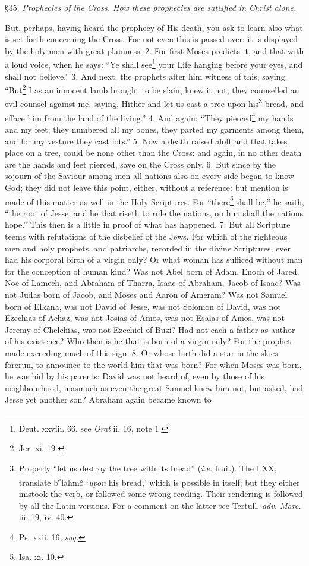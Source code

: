 
§35. \emph{Prophecies of the Cross. How these prophecies are satisfied in Christ alone.}

But, perhaps, having heard the prophecy of His death, you ask to learn also what is set forth concerning the Cross. For not even this is passed over: it is displayed by the holy men with great plainness. 2. For first Moses predicts it, and that with a loud voice, when he says: “Ye shall see\footnote{Deut. xxviii. 66, see \emph{Orat} ii. 16, note 1.} your Life hanging before your eyes, and shall not believe.” 3. And next, the prophets after him witness of this, saying: “But\footnote{Jer. xi. 19.} I as an innocent lamb brought to be slain, knew it not; they counselled an evil counsel against me, saying, Hither and let us cast a tree upon his\footnote{Properly “let us destroy the tree with its bread” (\emph{i.e.} fruit). The LXX, translate b\textsuperscript{e}lahmô ‘\emph{upon} his bread,’ which is possible in itself; but they either mistook the verb, or followed some wrong reading. Their rendering is followed by all the Latin versions. For a comment on the latter see Tertull. \emph{adv. Marc.} iii. 19, iv. 40.} bread, and efface him from the land of the living.” 4. And again: “They pierced\footnote{Ps. xxii. 16, \emph{sqq.}} my hands and my feet, they numbered all my bones, they parted my garments among them, and for my vesture they cast lots.” 5. Now a death raised aloft and that takes place on a tree, could be none other than the Cross: and again, in no other death are the hands and feet pierced, save on the Cross only. 6. But since by the sojourn of the Saviour among men all nations also on every side began to know God; they did not leave this point, either, without a reference: but mention is made of this matter as well in the Holy Scriptures. For “there\footnote{Isa. xi. 10.} shall be,” he saith, “the root of Jesse, and he that riseth to rule the nations, on him shall the nations hope.” This then is a little in proof of what has happened. 7. But all Scripture teems with refutations of the disbelief of the Jews. For which of the righteous men and holy prophets, and patriarchs, recorded in the divine Scriptures, ever had his corporal birth of a virgin only? Or what woman has sufficed without man for the conception of human kind? Was not Abel born of Adam, Enoch of Jared, Noe of Lamech, and Abraham of Tharra, Isaac of Abraham, Jacob of Isaac? Was not Judas born of Jacob, and Moses and Aaron of Ameram? Was not Samuel born of Elkana, was not David of Jesse, was not Solomon of David, was not Ezechias of Achaz, was not Josias of Amos, was not Esaias of Amos, was not Jeremy of Chelchias, was not Ezechiel of Buzi? Had not each a father as author of his existence? Who then is he that is born of a virgin only? For the prophet made exceeding much of this sign. 8. Or whose birth did a star in the skies forerun, to announce to the world him that was born? For when Moses was born, he was hid by his parents: David was not heard of, even by those of his neighbourhood, inasmuch as even the great Samuel knew him not, but asked, had Jesse yet another son? Abraham again became known to 